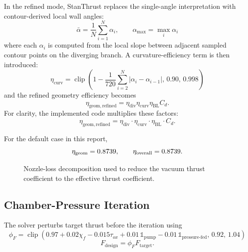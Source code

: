 \documentclass[11pt]{article}
\newcommand{\clip}{\operatorname{clip}}
\begin{document}
In the refined mode, StanThrust replaces the single-angle interpretation with contour-derived local wall angles:
\begin{equation}
\bar{\alpha} = \frac{1}{N}\sum_{i=1}^{N}\alpha_i,
\qquad
\alpha_{\max}=\max_i \alpha_i
\label{eq:contour-angles}
\end{equation}
where each $\alpha_i$ is computed from the local slope between adjacent sampled contour points on the diverging branch. A curvature-efficiency term is then introduced:
\begin{equation}
\eta_{\mathrm{curv}}
=
\clip\!\left(
1-\frac{1}{720}\sum_{i=2}^{N}\left|\alpha_i-\alpha_{i-1}\right|,
\,
0.90,
\,
0.998
\right)
\label{eq:curvature-efficiency}
\end{equation}
and the refined geometry efficiency becomes
\begin{equation}
\eta_{\mathrm{geom,refined}}
=
\eta_{\text{div}}
\eta_{\mathrm{curv}}
\eta_{\text{BL}}
C_d.
\label{eq:geom-eff-refined}
\end{equation}
For clarity, the implemented code multiplies these factors:
\begin{equation}
\eta_{\mathrm{geom,refined}}=
\eta_{\text{div}}
\cdot
\eta_{\mathrm{curv}}
\cdot
\eta_{\text{BL}}
\cdot
C_d.
\label{eq:geom-eff-refined-product}
\end{equation}

For the default case in this report,
\[
\eta_{\text{geom}}=0.8739,
\qquad
\eta_{\text{overall}}=0.8739.
\]

\begin{figure}[H]
\centering
{}
\caption{Nozzle-loss decomposition used to reduce the vacuum thrust coefficient to the effective thrust coefficient.}
\end{figure}

\subsection{Chamber-Pressure Iteration}
The solver perturbs target thrust before the iteration using
\begin{equation}
\phi_F=\clip\!\left(0.97+0.02\chi_f-0.015\tau_{ox}+0.01\,\mathbb{1}_{\text{pump}}-0.01\,\mathbb{1}_{\text{pressure-fed}},\,0.92,\,1.04\right)
\label{eq:thrust-bias}
\end{equation}
\begin{equation}
F_{\text{design}}=\phi_F F_{\text{target}}.
\label{eq:design-thrust}
\end{equation}
\end{document}
